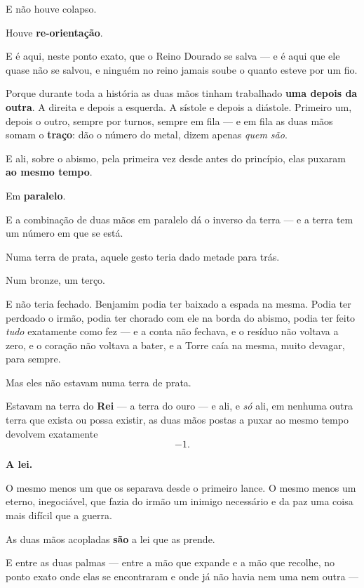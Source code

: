 \documentclass[livro.tex]{subfiles}
\begin{document}
E não houve colapso.

Houve \textbf{re-orientação}.

\medskip

E é aqui, neste ponto exato, que o Reino Dourado se salva --- e é aqui que ele quase não se salvou, e ninguém no
reino jamais soube o quanto esteve por um fio.

Porque durante toda a história as duas mãos tinham trabalhado \textbf{uma depois da outra}. A direita e depois a
esquerda. A sístole e depois a diástole. Primeiro um, depois o outro, sempre por turnos, sempre em fila --- e em
fila as duas mãos somam o \textbf{traço}: dão o número do metal, dizem apenas \emph{quem são}.

E ali, sobre o abismo, pela primeira vez desde antes do princípio, elas puxaram \textbf{ao mesmo tempo}.

Em \textbf{paralelo}.

\medskip

E a combinação de duas mãos em paralelo dá o inverso da terra --- e a terra tem um número em que se está.

Numa terra de prata, aquele gesto teria dado metade para trás.

Num bronze, um terço.

E não teria fechado. Benjamim podia ter baixado a espada na mesma. Podia ter perdoado o irmão, podia ter chorado
com ele na borda do abismo, podia ter feito \emph{tudo} exatamente como fez --- e a conta não fechava, e o resíduo
não voltava a zero, e o coração não voltava a bater, e a Torre caía na mesma, muito devagar, para sempre.

\medskip

Mas eles não estavam numa terra de prata.

Estavam na terra do \textbf{Rei} --- a terra do ouro --- e ali, e \emph{só} ali, em nenhuma outra terra
que exista ou possa existir, as duas mãos postas a puxar ao mesmo tempo devolvem exatamente
\[
 -1 .
\]

\medskip

\textbf{A lei.}

O mesmo menos um que os separava desde o primeiro lance. O mesmo menos um eterno, inegociável, que fazia do irmão um
inimigo necessário e da paz uma coisa mais difícil que a guerra.

As duas mãos acopladas \textbf{são} a lei que as prende.

\medskip

E entre as duas palmas --- entre a mão que expande e a mão que recolhe, no ponto exato onde elas se encontraram e
onde já não havia nem uma nem outra ---
\end{document}
